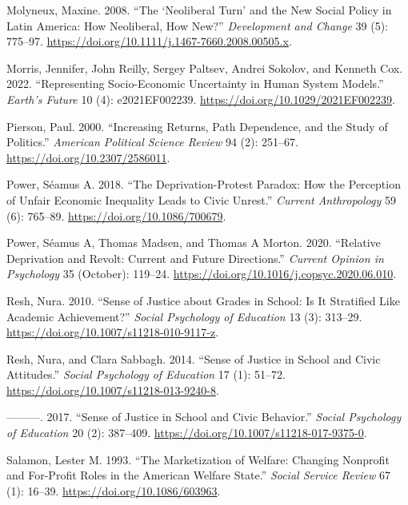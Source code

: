 \documentclass[
  letterpaper,
  DIV=11,
  numbers=noendperiod]{scrartcl}
\newlength{\cslhangindent}
\newenvironment{CSLReferences}[2] %
 {\begin{list}{}{%
  \setlength{\itemindent}{0pt}
  \setlength{\leftmargin}{0pt}
  \setlength{\parsep}{0pt}
  \ifodd #1
   \setlength{\leftmargin}{\cslhangindent}
   \setlength{\itemindent}{-1\cslhangindent}
  \fi
  \setlength{\itemsep}{#2\baselineskip}}}
 {\end{list}}
\begin{document}
\begin{CSLReferences}{1}{0}
Molyneux, Maxine. 2008. {``The {`{Neoliberal Turn}'} and the {New Social
Policy} in {Latin America}: {How Neoliberal}, {How New}?''}
\emph{Development and Change} 39 (5): 775--97.
\url{https://doi.org/10.1111/j.1467-7660.2008.00505.x}.

Morris, Jennifer, John Reilly, Sergey Paltsev, Andrei Sokolov, and
Kenneth Cox. 2022. {``Representing {Socio}-{Economic Uncertainty} in
{Human System Models}.''} \emph{Earth's Future} 10 (4): e2021EF002239.
\url{https://doi.org/10.1029/2021EF002239}.

Pierson, Paul. 2000. {``Increasing {Returns}, {Path Dependence}, and the
{Study} of {Politics}.''} \emph{American Political Science Review} 94
(2): 251--67. \url{https://doi.org/10.2307/2586011}.

Power, Séamus A. 2018. {``The {Deprivation-Protest Paradox}: {How} the
{Perception} of {Unfair Economic Inequality Leads} to {Civic Unrest}.''}
\emph{Current Anthropology} 59 (6): 765--89.
\url{https://doi.org/10.1086/700679}.

Power, Séamus A, Thomas Madsen, and Thomas A Morton. 2020. {``Relative
Deprivation and Revolt: Current and Future Directions.''} \emph{Current
Opinion in Psychology} 35 (October): 119--24.
\url{https://doi.org/10.1016/j.copsyc.2020.06.010}.

Resh, Nura. 2010. {``Sense of Justice about Grades in School: Is It
Stratified Like Academic Achievement?''} \emph{Social Psychology of
Education} 13 (3): 313--29.
\url{https://doi.org/10.1007/s11218-010-9117-z}.

Resh, Nura, and Clara Sabbagh. 2014. {``Sense of Justice in School and
Civic Attitudes.''} \emph{Social Psychology of Education} 17 (1):
51--72. \url{https://doi.org/10.1007/s11218-013-9240-8}.

---------. 2017. {``Sense of Justice in School and Civic Behavior.''}
\emph{Social Psychology of Education} 20 (2): 387--409.
\url{https://doi.org/10.1007/s11218-017-9375-0}.

Salamon, Lester M. 1993. {``The {Marketization} of {Welfare}: {Changing
Nonprofit} and {For-Profit Roles} in the {American Welfare State}.''}
\emph{Social Service Review} 67 (1): 16--39.
\url{https://doi.org/10.1086/603963}.


\end{CSLReferences}
\end{document}
